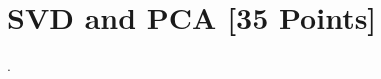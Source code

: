 \newif\ifshowsolutions
\showsolutionstrue







\pagestyle{fancy}



\section{SVD and PCA [35 Points]}

\problem[3] 

\begin{solution}
\end{solution}

\newpage
\problem[4] 

\begin{solution}
 
\end{solution}

\newpage
\problem[5] 

\begin{solution}

\end{solution}

\newpage
\problem[3] 

\begin{solution}

\end{solution}


\newpage
\problem[3] .

\begin{solution}

\end{solution}

\newpage
\problem[3] 

\begin{solution}

\end{solution} 

\newpage
\problem[4] 

\begin{solution}

\end{solution}


